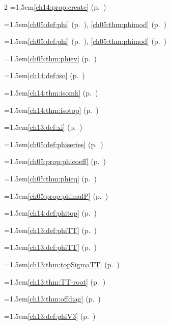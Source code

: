 \begin{multicols}{2}
\hangindent=1.5em\quad \ref{ch14:prop:create} (p.~\pageref{ch14:prop:create})\par
\hangindent=1.5em\quad \ref{ch05:def:phi} (p.~\pageref{ch05:def:phi}), \ref{ch05:thm:phimod} (p.~\pageref{ch05:thm:phimod})\par
\hangindent=1.5em\quad \ref{ch05:def:phi} (p.~\pageref{ch05:def:phi}), \ref{ch05:thm:phimod} (p.~\pageref{ch05:thm:phimod})\par
\hangindent=1.5em\quad \ref{ch05:thm:phiev} (p.~\pageref{ch05:thm:phiev})\par
\hangindent=1.5em\quad \ref{ch14:def:iso} (p.~\pageref{ch14:def:iso})\par
\hangindent=1.5em\quad \ref{ch14:thm:isomk} (p.~\pageref{ch14:thm:isomk})\par
\hangindent=1.5em\quad \ref{ch14:thm:isotop} (p.~\pageref{ch14:thm:isotop})\par
\hangindent=1.5em\quad \ref{ch13:def:xi} (p.~\pageref{ch13:def:xi})\par
\hangindent=1.5em\quad \ref{ch05:def:phiseries} (p.~\pageref{ch05:def:phiseries})\par
\hangindent=1.5em\quad \ref{ch05:prop:phicoeff} (p.~\pageref{ch05:prop:phicoeff})\par
\hangindent=1.5em\quad \ref{ch05:thm:phieq} (p.~\pageref{ch05:thm:phieq})\par
\hangindent=1.5em\quad \ref{ch05:prop:phimulP} (p.~\pageref{ch05:prop:phimulP})\par
\hangindent=1.5em\quad \ref{ch14:def:phitop} (p.~\pageref{ch14:def:phitop})\par
\hangindent=1.5em\quad \ref{ch13:def:phiTT} (p.~\pageref{ch13:def:phiTT})\par
\hangindent=1.5em\quad \ref{ch13:def:phiTT} (p.~\pageref{ch13:def:phiTT})\par
\hangindent=1.5em\quad \ref{ch13:thm:topSigmaTT} (p.~\pageref{ch13:thm:topSigmaTT})\par
\hangindent=1.5em\quad \ref{ch13:thm:TT-root} (p.~\pageref{ch13:thm:TT-root})\par
\hangindent=1.5em\quad \ref{ch13:thm:offdiag} (p.~\pageref{ch13:thm:offdiag})\par
\hangindent=1.5em\quad \ref{ch13:def:phiV3} (p.~\pageref{ch13:def:phiV3})\par

\end{multicols}
